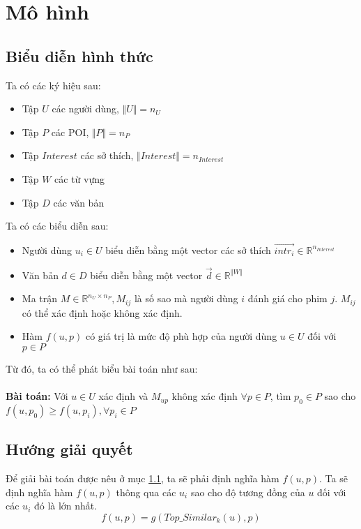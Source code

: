 \documentclass[12pt,a4paper]{report}
\begin{document}
\chapter{Mô hình}
\section{Biểu diễn hình thức} \label{PROB}
Ta có các ký hiệu sau:
\begin{itemize}
\item Tập $U$ các người dùng, $\Vert U \Vert = n_U$
\item Tập $P$ các POI, $\Vert P \Vert = n_P$
\item Tập $Interest$ các sở thích, $\Vert Interest \Vert = n_{Interest}$
\item Tập $W$ các từ vựng
\item Tập $D$ các văn bản
\end{itemize}
Ta có các biểu diễn sau:
\begin{itemize}
\item Người dùng $u_i \in U$ biểu diễn bằng một vector các sở thích $\overrightarrow{intr_i} \in \mathbb{R}^{n_{Interest}}$
\item Văn bản $d \in D$ biểu diễn bằng một vector $\overrightarrow{d} \in \mathbb{R}^{\Vert W \Vert}$
\item Ma trận $M \in \mathbb{R}^{n_U \times n_P}, M_{ij}$ là số sao mà người dùng $i$ đánh giá cho phim $j$. $M_{ij}$ có thể xác định hoặc không xác định.
\item Hàm $f(u, p)$ có giá trị là mức độ phù hợp của người dùng $u \in U$ đối với $p \in P$
\end{itemize}
Từ đó, ta có thể phát biểu bài toán như sau:\\\\
\textbf{Bài toán:} Với $u \in U$ xác định và $M_{up}$ không xác định $\forall p \in P$, tìm $p_0 \in P$ sao cho $f(u, p_0) \geq f(u, p_i), \forall p_i \in P$ 

\section{Hướng giải quyết}
Để giải bài toán được nêu ở mục \ref{PROB}, ta sẽ phải định nghĩa hàm $f(u, p)$. Ta sẽ định nghĩa hàm $f(u, p)$ thông qua các $u_i$ sao cho độ tương đồng của $u$ đối với các $u_i$ đó là lớn nhất.
\begin{equation} \label{f(u, p)}
f(u,p) = g(Top\_Similar_k(u), p)
\end{equation}
\end{document}
